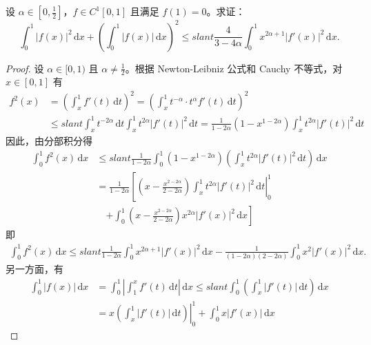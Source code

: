\documentclass[../../main.tex]{subfiles}
\begin{document}
\begin{example}
设 \( \alpha \in \left[0, \frac{1}{2}\right] \)，\( f \in C^1[0,1] \) 且满足 \( f(1) = 0 \)。求证：
\[
\int_{0}^{1} |f(x)|^2 \, \mathrm{d}x + \left( \int_{0}^{1} |f(x)| \, \mathrm{d}x \right)^2 \leqslant slant \frac{4}{3 - 4\alpha} \int_{0}^{1} x^{2\alpha + 1} |f'(x)|^2 \, \mathrm{d}x.
\]
\end{example}
\begin{proof}
设 \( \alpha \in [0,1) \) 且 \( \alpha \neq \frac{1}{2} \)。根据 Newton-Leibniz 公式和 Cauchy 不等式，对 \( x \in [0,1] \) 有
\begin{align*}
f^2(x) &= \left( \int_{x}^{1} f'(t) \, \mathrm{d}t \right)^2 = \left( \int_{x}^{1} t^{-\alpha} \cdot t^{\alpha} f'(t) \, \mathrm{d}t \right)^2 \\
&\leqslant slant \int_{x}^{1} t^{-2\alpha} \, \mathrm{d}t \int_{x}^{1} t^{2\alpha} |f'(t)|^2 \, \mathrm{d}t = \frac{1}{1 - 2\alpha} (1 - x^{1 - 2\alpha}) \int_{x}^{1} t^{2\alpha} |f'(t)|^2 \, \mathrm{d}t
\end{align*}
因此，由分部积分得
\begin{align*}
\int_{0}^{1} f^2(x) \, \mathrm{d}x &\leqslant slant \frac{1}{1 - 2\alpha} \int_{0}^{1} (1 - x^{1 - 2\alpha}) \left( \int_{x}^{1} t^{2\alpha} |f'(t)|^2 \, \mathrm{d}t \right) \, \mathrm{d}x \\
&= \frac{1}{1 - 2\alpha} \left[ \left. \left( x - \frac{x^{2 - 2\alpha}}{2 - 2\alpha} \right) \int_{x}^{1} t^{2\alpha} |f'(t)|^2 \, \mathrm{d}t \right|_{0}^{1} \right. \\
&\quad \left. + \int_{0}^{1} \left( x - \frac{x^{2 - 2\alpha}}{2 - 2\alpha} \right) x^{2\alpha} |f'(x)|^2 \, \mathrm{d}x \right]
\end{align*}
即
\begin{align}
\int_{0}^{1} f^2(x) \, \mathrm{d}x \leqslant slant \frac{1}{1 - 2\alpha} \int_{0}^{1} x^{2\alpha + 1} |f'(x)|^2 \, \mathrm{d}x - \frac{1}{(1 - 2\alpha)(2 - 2\alpha)} \int_{0}^{1} x^2 |f'(x)|^2 \, \mathrm{d}x .\label{5.1.5}
\end{align}
另一方面，有
\begin{align*}
\int_{0}^{1} |f(x)| \, \mathrm{d}x &= \int_{0}^{1} \left| \int_{1}^{x} f'(t) \, \mathrm{d}t \right| \, \mathrm{d}x \leqslant slant \int_{0}^{1} \left( \int_{x}^{1} |f'(t)| \, \mathrm{d}t \right) \, \mathrm{d}x \\
&= \left. x \left( \int_{x}^{1} |f'(t)| \, \mathrm{d}t \right) \right|_{0}^{1} + \int_{0}^{1} x |f'(x)| \, \mathrm{d}x
\end{align*}

\end{proof}
\end{document}
